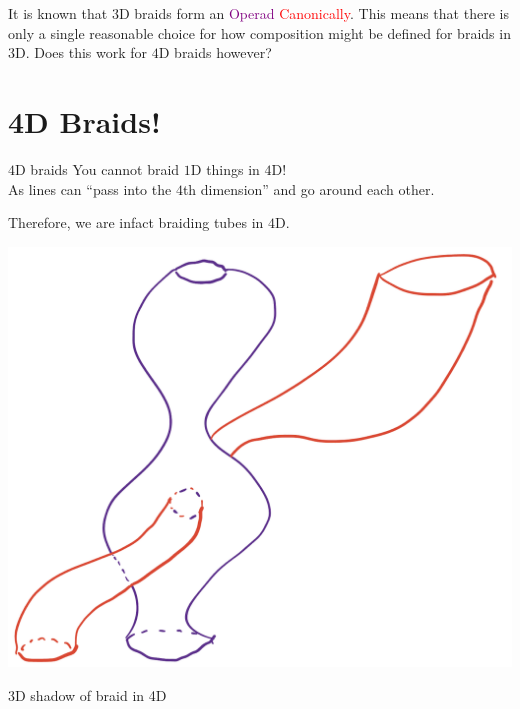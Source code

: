 \documentclass[14pt, xcolor=svgnames]{beamer}
\newcommand{\Purple}[1]{\textcolor{Purple}{#1}}
\begin{document}
\begin{frame}
    It is known that \( 3 \)D braids form an \Purple{Operad} \textcolor{Red}{Canonically}. 
    This means that there is only a single reasonable choice for how composition might be defined for braids in \( 3 \)D. 
    Does this work for \( 4 \)D braids however?
\end{frame}

\section{4D Braids!}
\begin{frame}{\( 4 \)D braids}
    You cannot braid \( 1 \)D things in \( 4 \)D! \\
    As lines can ``pass into the \( 4 \)th dimension'' and go around each other. \\
\end{frame}

\begin{frame}
    Therefore, we are infact braiding tubes in \( 4 \)D.
    \begin{center}
        \includegraphics[scale = 0.18]{images/2D tubes on 2D plane as 3D shadow of 4D space.png}
    \end{center}
    \begin{center}
    3D shadow of braid in 4D
    \end{center}
\end{frame}
\end{document}
